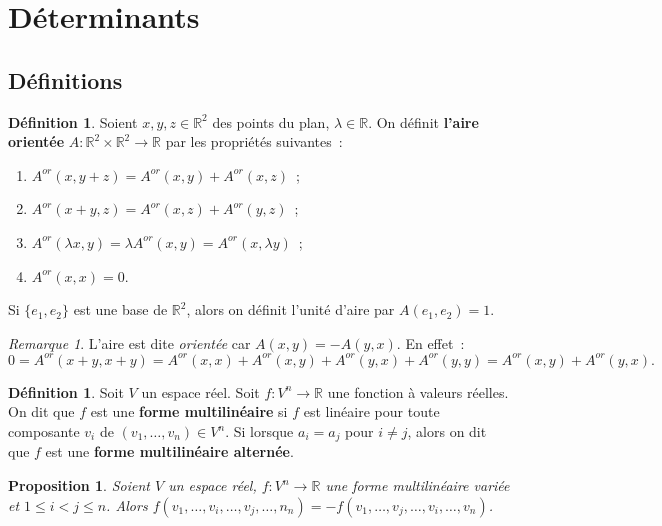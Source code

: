 \documentclass{article}
\newcommand{\R}{\mathbb R}
\newcommand{\Aor}{A^{or}}
\newtheorem{prp}[thm]{Proposition}
\theoremstyle{definition}
\newtheorem{déf}[thm]{Définition}
\theoremstyle{remark}
\newtheorem*{rmq}{Remarque}
\begin{document}
\section{Déterminants}
	\subsection{Définitions}
		\begin{déf} Soient $x, y, z \in \R^2$ des points du plan, $\lambda \in \R$. On définit \textbf{l'aire orientée} $A : \R^2 \times \R^2 \to \R$ par les propriétés suivantes~:

		\begin{enumerate}
			\item $\Aor(x, y+z) = \Aor(x, y) + \Aor(x, z)$~;
			\item $\Aor(x+y, z) = \Aor(x, z) + \Aor(y, z)$~;
			\item $\Aor(\lambda x, y) = \lambda\Aor(x, y) = \Aor(x, \lambda y)$~;
			\item $\Aor(x, x) = 0$.
		\end{enumerate}

		Si $\{e_1, e_2\}$ est une base de $\R^2$, alors on définit l'unité d'aire par $A(e_1, e_2) = 1$. \end{déf}

		\begin{rmq} L'aire est dite \textit{orientée} car $A(x, y) = -A(y, x)$. En effet~:
		\[0 = \Aor(x+y, x+y) = \Aor(x, x) + \Aor(x, y) + \Aor(y, x) + \Aor(y, y) = \Aor(x, y) + \Aor(y, x).\] \end{rmq}

		\begin{déf} Soit $V$ un espace réel. Soit $f : V^n \to \R$ une fonction à valeurs réelles. On dit que $f$ est une
		\textbf{forme multilinéaire} si $f$ est linéaire pour toute composante $v_i$ de $(v_1, \ldots, v_n) \in V^n$. Si lorsque $a_i = a_j$ pour $i \neq j$,
		alors on dit que $f$ est une \textbf{forme multilinéaire alternée}. \end{déf}

		\begin{prp}\label{ChangementDeSigneSwapDeParams} Soient $V$ un espace réel, $f : V^n \to \R$ une forme multilinéaire variée et $1 \leq i < j \leq n$. Alors
		$f(v_1, \ldots, v_i, \ldots, v_j, \ldots, n_n) = -f(v_1, \ldots, v_j, \ldots, v_i, \ldots, v_n)$. \end{prp}
\end{document}
